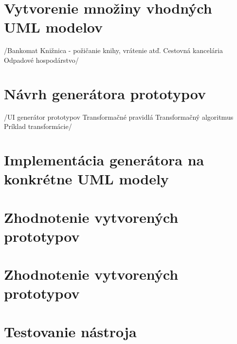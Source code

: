 \documentclass[a4paper]{feidippp}
\begin{document}
\section{Vytvorenie množiny vhodných UML modelov}
/Bankomat
Knižnica - požičanie knihy, vrátenie atď.
Cestovná kancelária
Odpadové hospodárstvo/

\section{	Návrh generátora prototypov}
/UI generátor prototypov
Transformačné pravidlá
Transformačný algoritmus
Príklad transformácie/

\section{Implementácia generátora na konkrétne UML modely}
\section{Zhodnotenie vytvorených prototypov}
\section{	Zhodnotenie vytvorených prototypov}
\section{Testovanie nástroja}



\listoffigures

\listoftables


\def\refname{Zoznam použitej literatúry}
\end{document}
